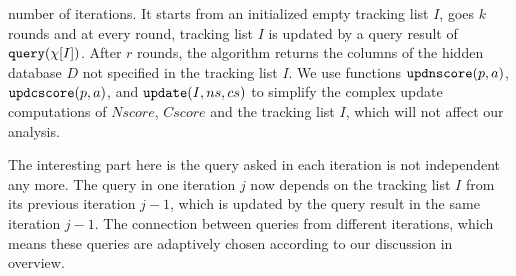 \begin{example}
number of iterations.
It starts from an initialized empty tracking list $I$,
{ goes $k$ rounds and at every round, tracking list $I$ is updated by a query result of ${\tt query}(\chi[I])$.
After $r$ rounds, the algorithm returns the columns of the hidden database $D$ not specified in the tracking list $I$.
We use functions $\mathtt{updnscore}(p,a)$,
$\mathtt{updcscore}(p,a)$,
and $\mathtt{update}(I,ns,cs)$ to simplify the complex update computations of $Nscore$, $Cscore$ and the tracking list $I$, 
which will not affect our analysis.%
}

{The interesting part here is the query asked in each iteration is not independent any more. 
The query in one iteration $j$ now depends on the tracking list $I$ from its previous iteration $j-1$, which is updated by the query result in the same iteration $j-1$. The connection between queries from different iterations, 
 which means these queries are adaptively chosen according to our discussion in overview.
}


\end{example}
